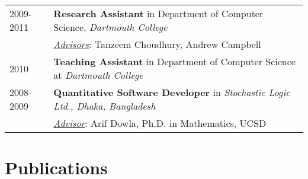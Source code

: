 \documentclass[10pt,fullpage]{article}
\begin{document}
\begin{longtable}{p{0.7in}|p{5.5in}}
	2009-2011 & {\bf Research Assistant} in Department of Computer Science, {\it Dartmouth College} \\
			& \underline{{\it Advisors}}: Tanzeem Choudhury, Andrew Campbell \vspace{0.15cm}\\
	2010 & {\bf Teaching Assistant} in Department of Computer Science at {\it Dartmouth College} \vspace{0.15cm}\\
			
	2008-2009 & {\bf Quantitative Software Developer} in {\it Stochastic Logic Ltd., Dhaka, Bangladesh}\\
			&  \underline{{\it Advisor}}: Arif Dowla, Ph.D. in Mathematics, UCSD\\	
\end{longtable}
\vspace{0.5em}



\section*{\textbf{Publications}}
\setlength{\extrarowheight}{10pt}
\begin{comment}
\subsection*{\textbf{Under review}}
\vspace{-1.5em}
\begin{longtable}{p{0.7in}|p{5.5in}}
  2015 & \bibentry{mash2015ubicomp} \\
  	  & \bibentry{mash2015wh} \\ 
	  &\\
\end{longtable}
\end{comment}
\end{document}
